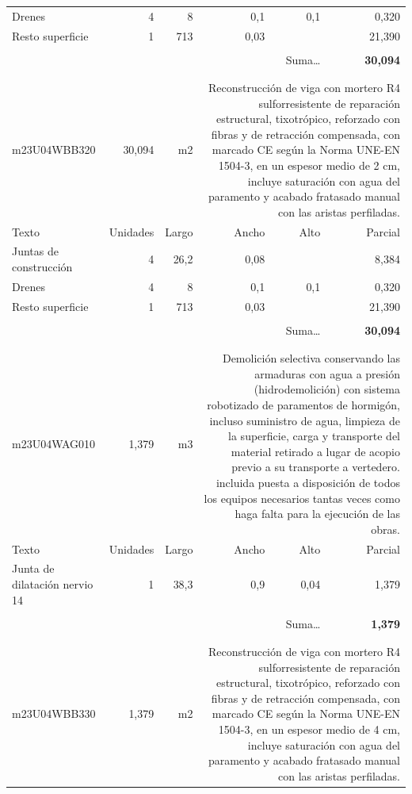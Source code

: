 \documentclass{book}%
\begin{document}
\begin{longtable}{lrrrrr}
\multicolumn{1}{p{3.5cm}}{Drenes}&4&8&0,1&0,1&     0,320\\%
\multicolumn{1}{p{3.5cm}}{Resto superficie}&1&713&0,03&&    21,390\\%
&&&&&\\%
\multicolumn{5}{r}{Suma\ldots}&\textbf{    30,094}\\%
\hline%
&&&&&\\%
&&&&&\\%
m23U04WBB320&    30,094& m2&\multicolumn{3}{p{6cm}}{\scriptsize Reconstrucción de viga con mortero R4 sulforresistente de reparación estructural, tixotrópico, reforzado con fibras y de retracción compensada, con marcado CE según la Norma UNE-EN 1504-3, en un espesor medio de 2 cm, incluye saturación con agua del paramento y acabado fratasado manual con las aristas perfiladas.\normalsize}\\%
Texto&Unidades&Largo&Ancho&Alto&Parcial\\%
\hline%
\multicolumn{1}{p{3.5cm}}{Juntas de construcción}&4&26,2&0,08&&     8,384\\%
\multicolumn{1}{p{3.5cm}}{Drenes}&4&8&0,1&0,1&     0,320\\%
\multicolumn{1}{p{3.5cm}}{Resto superficie}&1&713&0,03&&    21,390\\%
&&&&&\\%
\multicolumn{5}{r}{Suma\ldots}&\textbf{    30,094}\\%
\hline%
&&&&&\\%
&&&&&\\%
m23U04WAG010&     1,379& m3&\multicolumn{3}{p{6cm}}{\scriptsize Demolición selectiva conservando las armaduras con agua a presión (hidrodemolición) con sistema robotizado de paramentos de hormigón, incluso suministro de agua, limpieza de la superficie, carga y transporte del material retirado a lugar de acopio previo a su transporte a vertedero. incluida puesta a disposición de todos los equipos necesarios tantas veces como haga falta para la ejecución de las obras.\normalsize}\\%
Texto&Unidades&Largo&Ancho&Alto&Parcial\\%
\hline%
\multicolumn{1}{p{3.5cm}}{Junta de dilatación nervio 14}&1&38,3&0,9&0,04&     1,379\\%
&&&&&\\%
\multicolumn{5}{r}{Suma\ldots}&\textbf{     1,379}\\%
\hline%
&&&&&\\%
&&&&&\\%
m23U04WBB330&     1,379& m2&\multicolumn{3}{p{6cm}}{\scriptsize Reconstrucción de viga con mortero R4 sulforresistente de reparación estructural, tixotrópico, reforzado con fibras y de retracción compensada, con marcado CE según la Norma UNE-EN 1504-3, en un espesor medio de 4 cm, incluye saturación con agua del paramento y acabado fratasado manual con las aristas perfiladas.\normalsize}\\%

\end{longtable}
\end{document}
